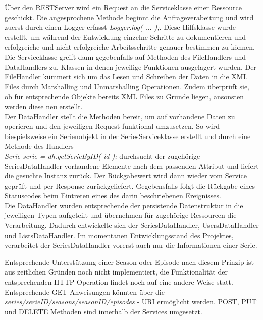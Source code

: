 Über den RESTServer wird ein Request an die Serviceklasse einer Ressource geschickt. Die angesprochene Methode beginnt die Anfrageverabeitung und wird zuerst durch einen Logger erfasst \textit{  Logger.log( ... );}. Diese Hilfsklasse wurde erstellt, um während der Entwicklung einzelne Schritte zu dokumentieren und erfolgreiche und nicht erfolgreiche Arbeitsschritte genauer bestimmen zu können. Die Serviceklasse greift dann gegebenfalls auf Methoden des FileHandlers und DataHandlers zu. Klassen in denen jeweilige Funktionen ausgelagert wurden. Der FileHandler kümmert sich um das Lesen und Schreiben der Daten in die XML Files durch Marshalling und Unmarshalling Operationen. Zudem überprüft sie, ob für entsprechende Objekte bereits XML Files zu Grunde liegen, ansonsten werden diese neu erstellt.\\
Der DataHandler stellt die Methoden bereit, um auf vorhandene Daten zu operieren und den jeweiligen Request funktional umzusetzen. So wird biespielsweise ein Serienobjekt in der SeriesServiceklasse erstellt und durch eine Methode des Handlers \\\textit{Serie serie = dh.getSerieByID( id );} durchsucht der zugehörige SeriesDataHandler  vorhandene Elemente nach dem passenden Attribut und liefert die gesuchte Instanz zurück. Der Rückgabewert wird dann wieder vom Service geprüft und per Response zurückgeliefert. Gegebensfalls folgt die Rückgabe eines Statuscodes beim Eintreten eines des darin beschriebenen Ereignisses.\\
Die DataHandler wurden entsprechende der persistende Datenstruktur in die jeweiligen Typen aufgeteilt und übernehmen für zugehörige Ressourcen die Verarbeitung. Dadurch entwickelte sich der SeriesDataHandler, UsersDataHandler und ListsDataHandler. Im momentanen Entwicklungsstand des Projektes, verarbeitet der SeriesDataHandler vorerst auch nur die Informationen einer Serie.

\vspace{0.2cm}

Entsprechende Unterstützung einer Season oder Episode nach diesem Prinzip ist aus zeitlichen Gründen noch nicht implementiert, die Funktionalität der entsprechenden HTTP Operation findet noch auf eine andere Weise statt. Entsprechende GET Anweisungen könnten über die \textit{series/{serieID}/seasons/{seasonID}/episodes} - URI ermöglicht werden. POST, PUT und DELETE Methoden sind innerhalb der Services umgesetzt.
